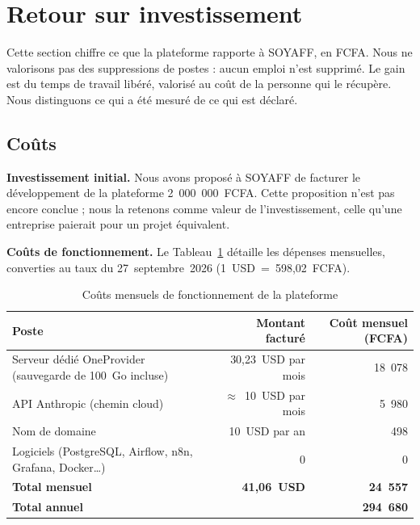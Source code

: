 




\section{Retour sur investissement}
\label{sec:roi}

Cette section chiffre ce que la plateforme rapporte à SOYAFF, en FCFA. Nous ne valorisons pas des suppressions de postes : aucun emploi n'est supprimé. Le gain est du temps de travail libéré, valorisé au coût de la personne qui le récupère. Nous distinguons ce qui a été mesuré de ce qui est déclaré.

\subsection{Coûts}
\label{sec:roi_couts}

\textbf{Investissement initial.} Nous avons proposé à SOYAFF de facturer le développement de la plateforme 2~000~000~FCFA. Cette proposition n'est pas encore conclue ; nous la retenons comme valeur de l'investissement, celle qu'une entreprise paierait pour un projet équivalent.

\textbf{Coûts de fonctionnement.} Le Tableau~\ref{tab:roi_couts} détaille les dépenses mensuelles, converties au taux du 27~septembre~2026 (1~USD~=~598,02~FCFA).

\begin{table}[H]
\centering
\footnotesize
\caption{Coûts mensuels de fonctionnement de la plateforme}
\label{tab:roi_couts}
\begin{tabularx}{\linewidth}{|>{\raggedright\arraybackslash}X|r|r|}
\hline
\rowcolor[HTML]{EFEFEF}
\textbf{Poste} & \textbf{Montant facturé} & \textbf{Coût mensuel (FCFA)} \\ \hline
Serveur dédié OneProvider (sauvegarde de 100~Go incluse) & 30,23~USD par mois & 18~078 \\ \hline
API Anthropic (chemin cloud) & $\approx$~10~USD par mois & 5~980 \\ \hline
Nom de domaine & 10~USD par an & 498 \\ \hline
Logiciels (PostgreSQL, Airflow, n8n, Grafana, Docker\ldots) & 0 & 0 \\ \hline
\textbf{Total mensuel} & \textbf{41,06~USD} & \textbf{24~557} \\ \hline
\textbf{Total annuel} & & \textbf{294~680} \\ \hline
\end{tabularx}
\end{table}

